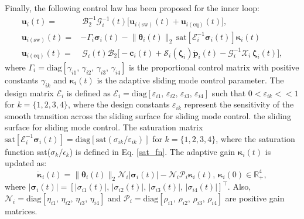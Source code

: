 \documentclass[lettersize,journal]{IEEEtran}
\begin{document}
Finally, the following control law has been proposed for the inner loop:
\begin{align} \label{control law for inner loop: equation}
    \boldsymbol{u}_i(t) =&~ \mathcal{B}_{2}^{-1} \mathcal{G}_i^{-1}(t) \big[ \boldsymbol{u}_{i (\text{sw})}(t) + \boldsymbol{u}_{i (\text{eq})}(t) \big], \nonumber \\
    \boldsymbol{u}_{i (\text{sw})}(t) =& - \Gamma_i \boldsymbol{\sigma}_i(t) - \lVert \boldsymbol{\theta}_i(t) \rVert_2 \, \text{sat}[ \mathcal{E}_i^{-1}\boldsymbol{\sigma}_i(t)] \boldsymbol{\kappa}_i(t)\nonumber\\
    \boldsymbol{u}_{i (\text{eq})}(t) =&~\mathcal{G}_i(t) \mathcal{B}_{2} \big[- \boldsymbol{c}_i(t) + \mathcal{S}_i(\boldsymbol{\zeta}_i) \dot{\boldsymbol{p}}_i(t) - \mathcal{G}_{i}^{-1} \mathcal{X}_i\,\boldsymbol{\zeta}_i(t) \big],
\end{align}
where $\Gamma_i = \text{diag}[\gamma_{i 1},\, \gamma_{i 2},\, \gamma_{i 3},\, \gamma_{i 4}]$  is the proportional control matrix with positive constants $\gamma_{i k}$ and $\boldsymbol{\kappa}_i(t)$ is the adaptive sliding mode control parameter.
The design matrix $\mathcal{E}_i$ is defined as $\mathcal{E}_i = \text{diag}[\varepsilon_{i 1}, \, \varepsilon_{i 2}, \, \varepsilon_{i 3}, \, \varepsilon_{i 4}]$ such that $0 < \varepsilon_{i k} << 1$ for $k = \{1, 2, 3, 4\}$, where the design constants $\varepsilon_{i k}$ represent the sensitivity of the smooth transition across the sliding surface for sliding mode control.
the sliding surface for sliding mode control.
The saturation matrix $\text{sat}[ \mathcal{E}_i^{-1}\boldsymbol{\sigma}_i(t)] = \text{diag}[\text{sat}(\sigma_{ik}/\varepsilon_{ik})]$ for $k = \{1, 2, 3, 4\}$, where the saturation function sat($\sigma_k/\epsilon_k$) is defined in Eq. \eqref{sat_fn}.
The adaptive gain $\boldsymbol{\kappa}_i(t)$ is updated as:
\begin{equation} \label{adaptive law for inner loop: equation}
    \dot{\boldsymbol{\kappa}}_i(t) =  \lVert \boldsymbol{\theta}_i(t) \rVert_2 \mathcal{N}_{i} \lvert \boldsymbol{\sigma}_i(t) \rvert - \mathcal{N}_{i} \mathcal{P}_{i} \boldsymbol{\kappa}_i(t), \, \boldsymbol{\kappa}_{i}(0) \in \mathbb{R}_+^4,
\end{equation}
where $\lvert \boldsymbol{\sigma}_i(t) \rvert  = \left[\lvert \sigma_{i 1}(t) \rvert,\, \lvert \sigma_{i 2}(t) \rvert,\, \lvert \sigma_{i 3}(t) \rvert,\, \lvert \sigma_{i 4}(t) \rvert\right]^{\top}$. Also, $\mathcal{N}_{i} = \text{diag}[\eta_{i 1},\, \eta_{i 2},\, \eta_{i 3},\, \eta_{i 4}]$ and $\mathcal{P}_{i} = \text{diag}[\rho_{i 1},\, \rho_{i 2},\, \rho_{i 3},\, \rho_{i 4}]$ are positive gain matrices.
\end{document}
